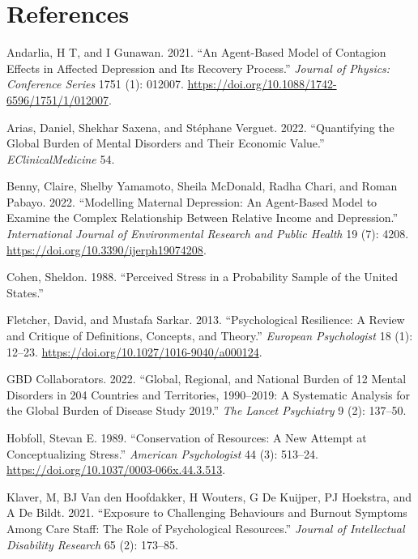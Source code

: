\documentclass[
  letterpaper,
  DIV=11,
  numbers=noendperiod]{scrartcl}
\newlength{\cslhangindent}
\newenvironment{CSLReferences}[2] %
 {\begin{list}{}{%
  \setlength{\itemindent}{0pt}
  \setlength{\leftmargin}{0pt}
  \setlength{\parsep}{0pt}
  \ifodd #1
   \setlength{\leftmargin}{\cslhangindent}
   \setlength{\itemindent}{-1\cslhangindent}
  \fi
  \setlength{\itemsep}{#2\baselineskip}}}
 {\end{list}}
\begin{document}
\section*{References}\label{references}

\footnotesize

\label{refs}
\begin{CSLReferences}{1}{0}
Andarlia, H T, and I Gunawan. 2021. {``An Agent-Based Model of Contagion
Effects in Affected Depression and Its Recovery Process.''}
\emph{Journal of Physics: Conference Series} 1751 (1): 012007.
\url{https://doi.org/10.1088/1742-6596/1751/1/012007}.

Arias, Daniel, Shekhar Saxena, and Stéphane Verguet. 2022.
{``Quantifying the Global Burden of Mental Disorders and Their Economic
Value.''} \emph{EClinicalMedicine} 54.

Benny, Claire, Shelby Yamamoto, Sheila McDonald, Radha Chari, and Roman
Pabayo. 2022. {``Modelling Maternal Depression: An Agent-Based Model to
Examine the Complex Relationship Between Relative Income and
Depression.''} \emph{International Journal of Environmental Research and
Public Health} 19 (7): 4208.
\url{https://doi.org/10.3390/ijerph19074208}.

Cohen, Sheldon. 1988. {``Perceived Stress in a Probability Sample of the
United States.''}

Fletcher, David, and Mustafa Sarkar. 2013. {``Psychological Resilience:
A Review and Critique of Definitions, Concepts, and Theory.''}
\emph{European Psychologist} 18 (1): 12--23.
\url{https://doi.org/10.1027/1016-9040/a000124}.

GBD Collaborators. 2022. {``Global, Regional, and National Burden of 12
Mental Disorders in 204 Countries and Territories, 1990--2019: A
Systematic Analysis for the Global Burden of Disease Study 2019.''}
\emph{The Lancet Psychiatry} 9 (2): 137--50.

Hobfoll, Stevan E. 1989. {``Conservation of Resources: A New Attempt at
Conceptualizing Stress.''} \emph{American Psychologist} 44 (3): 513--24.
\url{https://doi.org/10.1037/0003-066x.44.3.513}.

Klaver, M, BJ Van den Hoofdakker, H Wouters, G De Kuijper, PJ Hoekstra,
and A De Bildt. 2021. {``Exposure to Challenging Behaviours and Burnout
Symptoms Among Care Staff: The Role of Psychological Resources.''}
\emph{Journal of Intellectual Disability Research} 65 (2): 173--85.


\end{CSLReferences}
\end{document}
